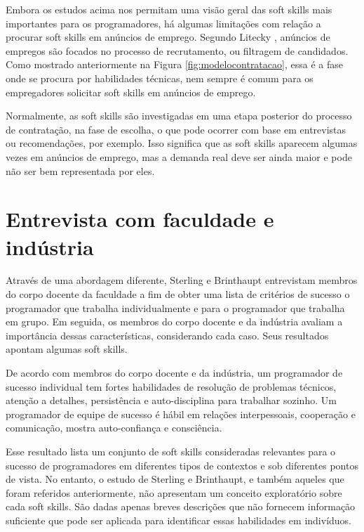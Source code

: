 Embora os estudos acima nos permitam uma visão geral das soft skills mais importantes para os programadores, há algumas limitações com relação a procurar soft skills em anúncios de emprego. Segundo Litecky \cite{litecky:04}, anúncios de empregos são focados no processo de recrutamento, ou filtragem de candidados. Como mostrado anteriormente na Figura \ref{fig:modelocontratacao}, essa é a fase onde se procura por habilidades técnicas, nem sempre é comum para os empregadores solicitar soft skills em anúncios de emprego.

Normalmente, as soft skills são investigadas em uma etapa posterior do processo de contratação, na fase de escolha, o que pode ocorrer com base em entrevistas ou recomendações, por exemplo. Isso significa que as soft skills aparecem algumas vezes em anúncios de emprego, mas a demanda real deve ser ainda maior e pode não ser bem representada por eles.

\section{Entrevista com faculdade e indústria}

Através de uma abordagem diferente, Sterling e Brinthaupt \cite{sterling:03} entrevistam membros do corpo docente da faculdade a fim de obter uma lista de critérios de sucesso o programador que trabalha individualmente e para o programador que trabalha em grupo. Em seguida, os membros do corpo docente e da indústria avaliam a importância dessas características, considerando cada caso. Seus resultados apontam algumas soft skills.

De acordo com membros do corpo docente e da indústria, um programador de sucesso individual tem fortes habilidades de resolução de problemas técnicos, atenção a detalhes, persistência e auto-disciplina para trabalhar sozinho. Um programador de equipe de sucesso é hábil em relações interpessoais, cooperação e comunicação, mostra auto-confiança e consciência.

Esse resultado lista um conjunto de soft skills consideradas relevantes para o sucesso de programadores em diferentes tipos de contextos e sob diferentes pontos de vista. No entanto, o estudo de Sterling e Brinthaupt, e também aqueles que foram referidos anteriormente, não apresentam um conceito exploratório sobre cada soft skills. São dadas apenas breves descrições que não fornecem informação suficiente que pode ser aplicada para identificar essas habilidades em indivíduos.

